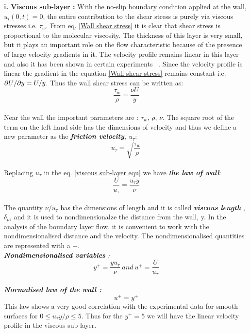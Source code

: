 \textbf{i. Viscous sub-layer :} With the no-slip boundary condition applied at the wall, \emph{$u_i(0,t) = 0$}, the entire contribution to the shear stress is purely via viscous stresses i.e. $\tau_w$. From eq. \ref{Wall shear stress} it is clear that shear stress is proportional to the molecular viscosity. The thickness of this layer is very small, but it plays an important role on the flow characteristic because of the presence of large velocity gradients in it. The velocity profile remains linear in this layer and also it has been shown in certain experiments ~\cite{cengel:book}. Since the velocity profile is linear the gradient in the equation \ref{Wall shear stress} remains constant i.e. ${\partial U}/{\partial y} = {U}/{y} $. Thus the wall shear stress can be written as:
\begin{equation}
	\label{viscous sub-layer equ}
	\frac{\tau_w}{\rho} = \frac{\nu U}{y}
\end{equation}\\
Near the wall the important parameters are : $\tau_w$, $\rho$, $\nu$. The square root of the term on the left hand side has the dimensions of velocity and thus we define a new parameter as the \emph{\textbf{friction velocity}, $u_\tau$}:
\begin{equation}
	\label{friction velociy}
	u_\tau = \sqrt{\frac{\tau_w}{\rho}}
\end{equation}\\
Replacing $u_\tau$ in the eq. \ref{viscous sub-layer equ} we have \emph{\textbf{the law of wall}}:
\begin{equation}
	\label{law of wall}
	\frac{U}{u_\tau} =  \frac{u_\tau y}{\nu}
\end{equation}\\
The quantity $\nu / u_\tau $ has the dimensions of length and it is called \emph{\textbf{viscous length}} , $\delta_\nu$,  and it is used to nondimensionalze the distance from the wall, y. In the analysis of the boundary layer flow, it is convenient to work with the nondimensionalised distance and the velocity. The nondimensionalised quantities are represented with a $+$. \\
\emph{\textbf{Nondimensionalised variables} : } \begin{equation}
	\label{nondimensions}
	y^+ = \frac{y u_\tau }{\nu} \    and \    u^+ = \frac{U}{u_\tau}
\end{equation}\\
\emph{\textbf{Normalised law of the wall : }}\begin{equation}
	\label{nondimensions law of wall}
	u^+ = y^+ 
\end{equation}
This law shows a very good correlation with the experimental data for smooth surfaces for $0\leq {u_\tau y}/{\rho} \leq 5	$. Thus for the $y^+ =  5$ we will have the linear velocity profile in the viscous sub-layer. \\

